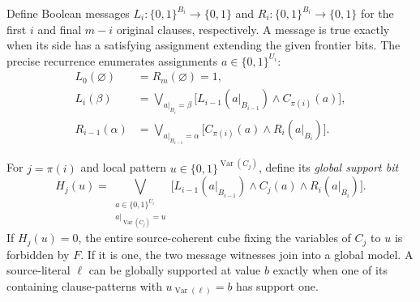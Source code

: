 \documentclass[10pt]{article}
\begin{document}
Define Boolean messages $L_i:\{0,1\}^{B_i}\to\{0,1\}$ and $R_i:\{0,1\}^{B_i}\to\{0,1\}$ for the first $i$ and final $m-i$ original clauses, respectively. A message is true exactly when its side has a satisfying assignment extending the given frontier bits. The precise recurrence enumerates assignments $a\in\{0,1\}^{U_i}$:
\[
\begin{split}
 L_0(\varnothing)&=R_m(\varnothing)=1,\\
 L_i(\beta)&=\bigvee_{a|_{B_i}=\beta}
 \Big[L_{i-1}(a|_{B_{i-1}})\land C_{\pi(i)}(a)\Big],\\
 R_{i-1}(\alpha)&=\bigvee_{a|_{B_{i-1}}=\alpha}
 \Big[C_{\pi(i)}(a)\land R_i(a|_{B_i})\Big].
\end{split}
\]

For $j=\pi(i)$ and local pattern $u\in\{0,1\}^{\operatorname{Var}(C_j)}$, define its \emph{global support bit}
\[
 H_{j}(u)=\bigvee_{\substack{a\in\{0,1\}^{U_i}\\a|_{\operatorname{Var}(C_j)}=u}}
 \Big[L_{i-1}(a|_{B_{i-1}})\land C_j(a)\land R_i(a|_{B_i})\Big].
\]
If $H_j(u)=0$, the entire source-coherent cube fixing the variables of $C_j$ to $u$ is forbidden by $F$. If it is one, the two message witnesses join into a global model. A source-literal $\ell$ can be globally supported at value $b$ exactly when one of its containing clause-patterns with $u_{\operatorname{Var}(\ell)}=b$ has support one.
\end{document}
